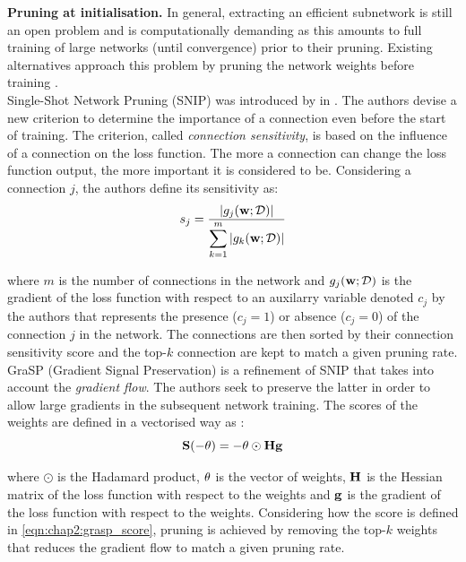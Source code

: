 \noindent\textbf{Pruning at initialisation.} In general, extracting an efficient
subnetwork is still an open problem and is computationally demanding as this
amounts to full training of large networks (until convergence) prior to their
pruning. Existing alternatives approach this problem by pruning the network
weights before training \cite{DBLP:conf/iclr/LeeAT19,DBLP:conf/iclr/WangZG20,DBLP:conf/nips/TanakaKYG20}.\\

Single-Shot Network Pruning (SNIP) was introduced by
\citeauthor{DBLP:conf/iclr/LeeAT19} in \cite{DBLP:conf/iclr/LeeAT19}. The
authors devise a new criterion to determine the importance of a connection even
before the start of training. The criterion, called \emph{connection
sensitivity}, is based on the influence of a connection on the loss function.
The more a connection can change the loss function output, the more important it
is considered to be. Considering a connection $j$, the authors define its
sensitivity as:
\begin{equation}
  \label{eq:snip}
  s_j=\displaystyle\frac{|g_j(\bf{w};\mathcal{D})|}{\displaystyle\sum_{k=1}^m |g_{k}(\bf{w};\mathcal{D})|}
\end{equation}

\noindent where $m$ is the number of connections in the network and
$g_j(\bf{w};\mathcal{D})$ is the gradient of the loss function with respect to
an auxilarry variable denoted $c_j$ by the authors that represents the presence
($c_j=1$) or absence ($c_j=0$) of the connection $j$ in the network. The
connections are then sorted by their connection sensitivity score and the
top-$k$ connection are kept to match a given pruning rate.\\

GraSP (Gradient Signal Preservation) \cite{DBLP:conf/iclr/WangZG20} is a
refinement of SNIP that takes into account the \emph{gradient flow}. The authors
seek to preserve the latter in order to allow large gradients in the subsequent
network training. The scores of the weights are defined in a vectorised way as :
\begin{equation}
  \label{eqn:chap2:grasp_score}
  \bf{S}(-\bf{\theta}) = -\bf{\theta} \odot \bf{H} \bf{g}
\end{equation}

\noindent where $\odot$ is the Hadamard product, $\bf{\theta}$ is the vector of
weights, $\bf{H}$ is the Hessian matrix of the loss function with respect to the
weights and $\bf{g}$ is the gradient of the loss function with respect to the
weights. Considering how the score is defined in \cref{eqn:chap2:grasp_score},
pruning is achieved by removing the top-$k$ weights that reduces the gradient
flow to match a given pruning rate.\\

